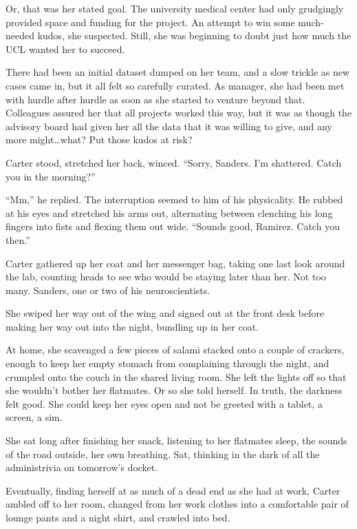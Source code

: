 Or, that was her stated goal. The university medical center had only grudgingly provided space and funding for the project. An attempt to win some much-needed kudos, she suspected. Still, she was beginning to doubt just how much the UCL wanted her to succeed.

There had been an initial dataset dumped on her team, and a slow trickle as new cases came in, but it all felt so carefully curated. As manager, she had been met with hurdle after hurdle as soon as she started to venture beyond that. Colleagues assured her that all projects worked this way, but it was as though the advisory board had given her all the data that it was willing to give, and any more might\ldots{}what? Put those kudos at risk?

Carter stood, stretched her back, winced. ``Sorry, Sanders. I'm shattered. Catch you in the morning?''

``Mm,'' he replied. The interruption seemed to him of his physicality. He rubbed at his eyes and stretched his arms out, alternating between clenching his long fingers into fists and flexing them out wide. ``Sounds good, Ramirez. Catch you then.''

Carter gathered up her coat and her messenger bag, taking one last look around the lab, counting heads to see who would be staying later than her. Not too many. Sanders, one or two of his neuroscientists.

She swiped her way out of the wing and signed out at the front desk before making her way out into the night, bundling up in her coat.

At home, she scavenged a few pieces of salami stacked onto a couple of crackers, enough to keep her empty stomach from complaining through the night, and crumpled onto the couch in the shared living room. She left the lights off so that she wouldn't bother her flatmates. Or so she told herself. In truth, the darkness felt good. She could keep her eyes open and not be greeted with a tablet, a screen, a sim.

She sat long after finishing her snack, listening to her flatmates sleep, the sounds of the road outside, her own breathing. Sat, thinking in the dark of all the administrivia on tomorrow's docket.

Eventually, finding herself at as much of a dead end as she had at work, Carter ambled off to her room, changed from her work clothes into a comfortable pair of lounge pants and a night shirt, and crawled into bed.
